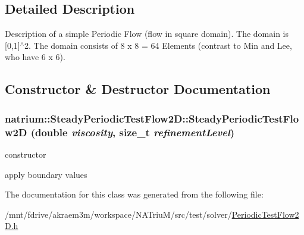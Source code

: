 \subsection{Detailed Description}
Description of a simple Periodic Flow (flow in square domain). The domain is \mbox{[}0,1\mbox{]}$^\wedge$2. The domain consists of 8 x 8 = 64 Elements (contrast to Min and Lee, who have 6 x 6). 

\subsection{Constructor \& Destructor Documentation}
\hypertarget{classnatrium_1_1SteadyPeriodicTestFlow2D_a7db4598e86b34158612497ea2ff0ca74}{
\subsubsection[{SteadyPeriodicTestFlow2D}]{\setlength{\rightskip}{0pt plus 5cm}natrium::SteadyPeriodicTestFlow2D::SteadyPeriodicTestFlow2D (double {\em viscosity}, \/  size\_\-t {\em refinementLevel})}}
\label{classnatrium_1_1SteadyPeriodicTestFlow2D_a7db4598e86b34158612497ea2ff0ca74}


constructor 

apply boundary values 

The documentation for this class was generated from the following file:\begin{DoxyCompactItemize}
\item 
/mnt/fdrive/akraem3m/workspace/NATriuM/src/test/solver/\hyperlink{PeriodicTestFlow2D_8h}{PeriodicTestFlow2D.h}\end{DoxyCompactItemize}
